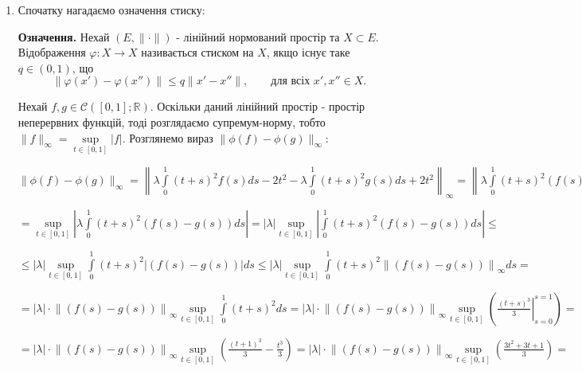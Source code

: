 \documentclass[a5paper, 20pt, titlepage]{article}
\begin{document}
\begin{enumerate}

\item Спочатку нагадаємо означення стиску:

\textbf{Означення.} \quad Нехай $\left( E, \| \cdot \| \right)$ - лінійний нормований простір та $X \subset E$. Відображення $\varphi: X \rightarrow X$ називається стиском на $X$, якщо існує таке $q \in (0, 1)$, що 
\vspace{-3mm}
$$ \| \varphi(x') - \varphi(x'') \| \leqslant q \| x' - x'' \|, \qquad \text{для всіх $x', x'' \in X$.}$$

Нехай $f, g \in  \mathcal{C} \left( [0, 1]; \mathbb{R} \right)$. Оскільки даний лінійний простір - простір неперервних функцій, тоді розглядаємо супремум-норму, тобто $\| f \|_\infty = \sup \limits_{t \in [0, 1]} |f|$. Розглянемо вираз $\| \phi(f) - \phi(g)\|_\infty$:

$\| \phi(f) - \phi(g)\|_\infty = \left\|  \lambda \int \limits_{0}^{1} (t + s)^2 f(s) ds - 2t^2 -  \lambda \int \limits_{0}^{1} (t + s)^2 g(s) ds + 2t^2 \right\|_\infty = \left\| \lambda  \int \limits_{0}^{1} (t + s)^2 \left(f(s) - g(s) \right) ds  \right\|_\infty = $

\vspace{3mm}
\hspace{23mm}
$= \sup \limits_{t \in [0, 1]} \left| \lambda  \int \limits_{0}^{1} (t + s)^2 \left(f(s) - g(s) \right) ds \right|
= |\lambda| \sup \limits_{t \in [0, 1]} \left| \int \limits_{0}^{1}  (t + s)^2 \left(f(s) - g(s) \right)  ds \right| \leqslant $

\vspace{3mm}
\hspace{23mm}
$\leqslant |\lambda| \sup \limits_{t \in [0, 1]}  \int \limits_{0}^{1} (t + s)^2 \left| \left(f(s) - g(s) \right) \right| ds \leqslant
|\lambda| \sup \limits_{t \in [0, 1]}  \int \limits_{0}^{1}  (t + s)^2  \left\| \left(f(s) - g(s) \right) \right\|_\infty ds =$

\vspace{3mm}
\hspace{23mm}
$= |\lambda| \cdot \left\| \left(f(s) - g(s) \right) \right\|_\infty  \sup \limits_{t \in [0, 1]}  \int \limits_{0}^{1} (t + s)^2 ds =
|\lambda| \cdot \left\| \left(f(s) - g(s) \right) \right\|_\infty  \sup \limits_{t \in [0, 1]}  \left( \left. \frac{(t+s)^3}{3} \right|_{s = 0}^{s = 1} \right) =$

\vspace{3mm}
\hspace{23mm}
$= |\lambda| \cdot \left\| \left(f(s) - g(s) \right) \right\|_\infty  \sup \limits_{t \in [0, 1]}  \left( \frac{(t+1)^3}{3} - \frac{t^3}{3} \right) = 
|\lambda| \cdot \left\| \left(f(s) - g(s) \right) \right\|_\infty  \sup \limits_{t \in [0, 1]}  \left(\frac{3t^2+3t + 1}{3} \right) =$


\end{enumerate}
\end{document}
